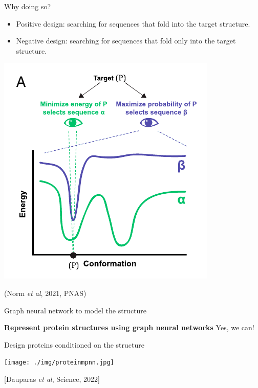 \documentclass[presentation,smaller]{beamer}
\begin{document}
\begin{frame}[label={sec:orgc87f744}]{Why doing so?}
\begin{itemize}
\item Positive design: searching for sequences that fold into the target structure.
\item Negative design: searching for sequences that fold \alert{only} into the target structure.
\end{itemize}

\begin{center}
\includegraphics[scale=0.7]{./img/af_landscape_optimization.png}
\end{center}

(Norm \emph{et al}, 2021, PNAS)
\end{frame}

\begin{frame}[label={sec:org88e2d38}]{Graph neural network to model the structure}
\begin{center}
\Large \textbf{Represent protein structures using graph neural networks}
Yes, we can!
\end{center}
\end{frame}
\begin{frame}[label={sec:org5c42045}]{Design proteins conditioned on the structure}
\begin{center}
\texttt{[image: ./img/proteinmpnn.jpg]}
\end{center}
[Dauparas \emph{et al}, Science, 2022]
\end{frame}
\end{document}
